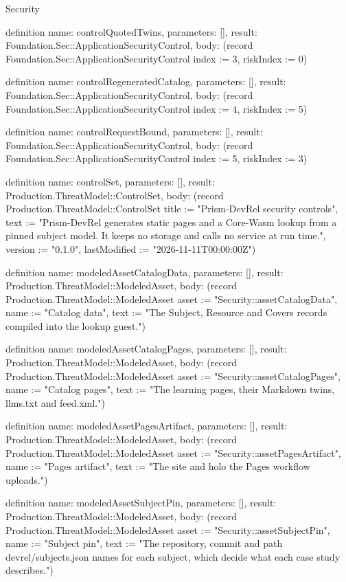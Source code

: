 \begin{lexlean}{Security}
\begin{semanticmodule}
definition{
  name: controlQuotedTwins,
  parameters: [],
  result: Foundation.Sec::ApplicationSecurityControl,
  body: (record Foundation.Sec::ApplicationSecurityControl {index := 3, riskIndex := 0})
}

definition{
  name: controlRegeneratedCatalog,
  parameters: [],
  result: Foundation.Sec::ApplicationSecurityControl,
  body: (record Foundation.Sec::ApplicationSecurityControl {index := 4, riskIndex := 5})
}

definition{
  name: controlRequestBound,
  parameters: [],
  result: Foundation.Sec::ApplicationSecurityControl,
  body: (record Foundation.Sec::ApplicationSecurityControl {index := 5, riskIndex := 3})
}

definition{
  name: controlSet,
  parameters: [],
  result: Production.ThreatModel::ControlSet,
  body: (record Production.ThreatModel::ControlSet {title := "Prism-DevRel security controls", text := "Prism-DevRel generates static pages and a Core-Wasm lookup from a pinned subject model. It keeps no storage and calls no service at run time.", version := "0.1.0", lastModified := "2026-11-11T00:00:00Z"})
}

definition{
  name: modeledAssetCatalogData,
  parameters: [],
  result: Production.ThreatModel::ModeledAsset,
  body: (record Production.ThreatModel::ModeledAsset {asset := "Security::assetCatalogData", name := "Catalog data", text := "The Subject, Resource and Covers records compiled into the lookup guest."})
}

definition{
  name: modeledAssetCatalogPages,
  parameters: [],
  result: Production.ThreatModel::ModeledAsset,
  body: (record Production.ThreatModel::ModeledAsset {asset := "Security::assetCatalogPages", name := "Catalog pages", text := "The learning pages, their Markdown twins, llms.txt and feed.xml."})
}

definition{
  name: modeledAssetPagesArtifact,
  parameters: [],
  result: Production.ThreatModel::ModeledAsset,
  body: (record Production.ThreatModel::ModeledAsset {asset := "Security::assetPagesArtifact", name := "Pages artifact", text := "The site and holo the Pages workflow uploads."})
}

definition{
  name: modeledAssetSubjectPin,
  parameters: [],
  result: Production.ThreatModel::ModeledAsset,
  body: (record Production.ThreatModel::ModeledAsset {asset := "Security::assetSubjectPin", name := "Subject pin", text := "The repository, commit and path devrel/subjects.json names for each subject, which decide what each case study describes."})
}


\end{semanticmodule}
\end{lexlean}
